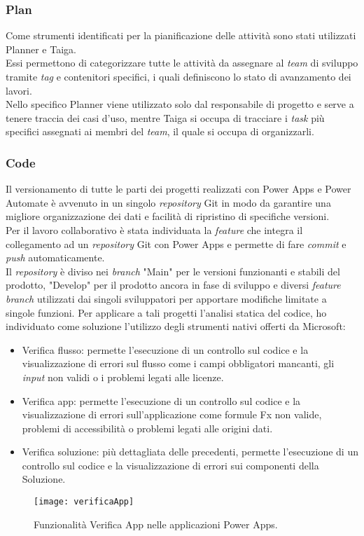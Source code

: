 \subsubsection*{Plan}
Come strumenti identificati per la pianificazione delle attività sono stati utilizzati Planner e Taiga.\\
Essi permettono di categorizzare tutte le attività da assegnare al \emph{team} di sviluppo tramite \emph{tag} e contenitori specifici, i quali definiscono lo stato di avanzamento dei lavori.\\
Nello specifico Planner viene utilizzato solo dal responsabile di progetto e serve a tenere traccia dei casi d'uso, mentre Taiga si occupa di tracciare i \emph{task} più specifici assegnati ai membri del \emph{team}, il quale si occupa di organizzarli.

\subsubsection*{Code}
Il versionamento di tutte le parti dei progetti realizzati con Power Apps e Power Automate è avvenuto in un singolo \emph{repository} Git in modo da garantire una migliore organizzazione dei dati e facilità di ripristino di specifiche versioni.\\
Per il lavoro collaborativo è stata individuata la \emph{feature} che integra il collegamento ad un \emph{repository} Git con Power Apps e permette di fare \emph{commit} e \emph{push} automaticamente.\\
Il \emph{repository} è diviso nei \emph{branch} "Main" per le versioni funzionanti e stabili del prodotto, "Develop" per il prodotto ancora in fase di sviluppo e diversi \emph{feature branch} utilizzati dai singoli sviluppatori per apportare modifiche limitate a singole funzioni. 
Per applicare a tali progetti l'analisi statica del codice, ho individuato come soluzione l'utilizzo degli strumenti nativi offerti da Microsoft:
\begin{itemize}
    \item Verifica flusso: permette l'esecuzione di un controllo sul codice e la visualizzazione di errori sul flusso come i campi obbligatori mancanti, gli \emph{input} non validi o i problemi legati alle licenze. 
    \item Verifica app: permette l'esecuzione di un controllo sul codice e la visualizzazione di errori sull'applicazione come formule Fx non valide, problemi di accessibilità o problemi legati alle origini dati. 
    \item Verifica soluzione: più dettagliata delle precedenti, permette l'esecuzione di un controllo sul codice e la visualizzazione di errori sui componenti della Soluzione. 
\end{itemize}
\begin{figure}[htbp] 
    \centering 
    \texttt{[image: verificaApp]} 
    \caption{Funzionalità Verifica App nelle applicazioni Power Apps.}
    \label{fig:verificaApp}
\end{figure}

